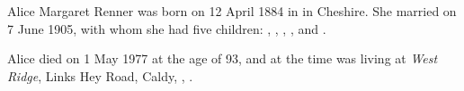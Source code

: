 
Alice Margaret Renner was born on 12 April 1884 in  in Cheshire.\cite{UKCensus1911_RG14_22074} She married  on 7 June 1905\cite{CheshireParishRegisters}, with whom she had five children: , , , , and .

Alice died on 1 May 1977 at the age of 93, and at the time was living at \emph{West Ridge}, Links Hey Road, Caldy, , .\cite{AMRennerDeath}
